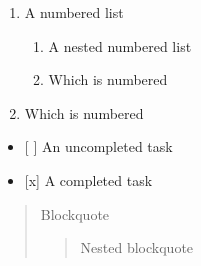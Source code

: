 \documentclass[letterpaper,10pt,english]{sphinxmanual}
\begin{document}
\begin{sphinxVerbatim}[commandchars=\\\{\}]
     
                
                     
              
\end{sphinxVerbatim}
\begin{enumerate}
%
\item {} 
\sphinxAtStartPar
A numbered list
\begin{enumerate}
%
\item {} 
\sphinxAtStartPar
A nested numbered list

\item {} 
\sphinxAtStartPar
Which is numbered

\end{enumerate}

\item {} 
\sphinxAtStartPar
Which is numbered

\end{enumerate}

\begin{sphinxVerbatim}[commandchars=\\\{\}]
      
                  
                 
             
\end{sphinxVerbatim}
\begin{itemize}
\item {} 
\sphinxAtStartPar
{[} {]} An uncompleted task

\item {} 
\sphinxAtStartPar
{[}x{]} A completed task

\end{itemize}

\begin{sphinxVerbatim}[commandchars=\\\{\}]
    \PYG{p}{[} \PYG{p}{]}   
           \PYG{p}{[}\PYG{p}{]}   
\end{sphinxVerbatim}
\begin{quote}

\sphinxAtStartPar
Blockquote
\begin{quote}

\sphinxAtStartPar
Nested blockquote
\end{quote}
\end{quote}
\end{document}
